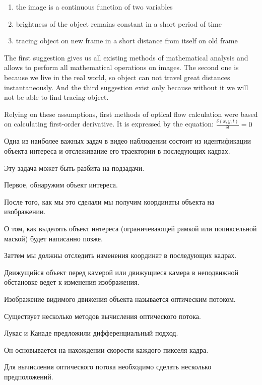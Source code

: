 \documentclass[12pt,a4paper,oneside,titlepage]{article}
\begin{document}
\begin{enumerate}
  \item the image is a continuous function of two variables
  \item brightness of the object remains constant in a short period of time
  \item tracing object on new frame in a short distance from itself on old frame
\end{enumerate}

The first suggestion gives us all existing methods of mathematical analysis and allows to perform all mathematical operations on images.
The second one is because we live in the real world, so object can not travel great distances instantaneously.
And the third suggestion exist only because without it we will not be able to find tracing object.

Relying on these assumptions, first methods of optical flow calculation were based on calculating first-order derivative.
It is expressed by the equation: {\Large$\frac{\delta (x, y, t)}{\delta t} = 0$}








Одна из наиболее важных задач в видео наблюдении состоит из идентификации объекта интереса и отслеживание его траектории в последующих кадрах.

Эту задача может быть разбита на подзадачи.

Первое, обнаружим объект интереса.

После того, как мы это сделали мы получим координаты объекта на изображении.

О том, как выделять объект интереса (ограничевающей рамкой или попиксельной маской) будет написанно позже.

Заттем мы должны отследить изменения координат в последующих кадрах.

Движущийся объект перед камерой или движущиеся камера в неподвижной обстановке ведет к изменения изображения.

Изображение видимого движения объекта называется оптическим потоком.

Существует несколько методов вычисления оптического потока.

Лукас и Канаде предложили дифференциальный подход.

Он основывается на нахождении скорости каждого пикселя кадра.

Для вычисления оптического потока необходимо сделать несколько предположений.
\end{document}
